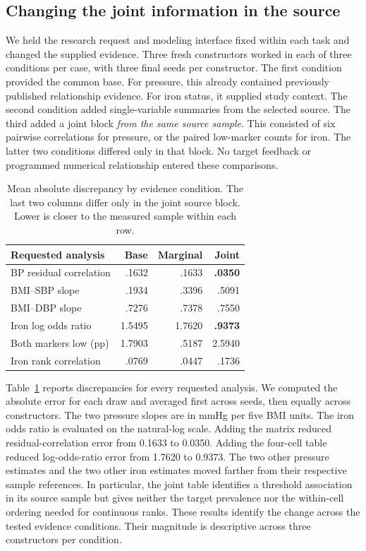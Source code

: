 \documentclass[sigconf,anonymous,review]{acmart}
\begin{document}
\subsection{Changing the joint information in the source}
\label{sec:controlled}
We held the research request and modeling interface fixed within each task and changed the supplied evidence. Three fresh constructors worked in each of three conditions per case, with three final seeds per constructor. The first condition provided the common base. For pressure, this already contained previously published relationship evidence. For iron status, it supplied study context. The second condition added single-variable summaries from the selected source. The third added a joint block \emph{from the same source sample}. This consisted of six pairwise correlations for pressure, or the paired low-marker counts for iron. The latter two conditions differed only in that block. No target feedback or programmed numerical relationship entered these comparisons.

\begin{table}[t]
\caption{Mean absolute discrepancy by evidence condition. The last two columns differ only in the joint source block. Lower is closer to the measured sample within each row.}
\label{tab:evidence}
\centering
\begin{tabular}{@{}lrrr@{}}
\toprule
Requested analysis & Base & Marginal & Joint\\
\midrule
BP residual correlation & .1632 & .1633 & \textbf{.0350}\\
BMI--SBP slope & .1934 & .3396 & .5091\\
BMI--DBP slope & .7276 & .7378 & .7550\\
Iron log odds ratio & 1.5495 & 1.7620 & \textbf{.9373}\\
Both markers low (pp) & 1.7903 & .5187 & 2.5940\\
Iron rank correlation & .0769 & .0447 & .1736\\
\bottomrule
\end{tabular}
\end{table}

Table~\ref{tab:evidence} reports discrepancies for every requested analysis. We computed the absolute error for each draw and averaged first across seeds, then equally across constructors. The two pressure slopes are in mmHg per five BMI units. The iron odds ratio is evaluated on the natural-log scale. Adding the matrix reduced residual-correlation error from 0.1633 to 0.0350. Adding the four-cell table reduced log-odds-ratio error from 1.7620 to 0.9373. The two other pressure estimates and the two other iron estimates moved farther from their respective sample references. In particular, the joint table identifies a threshold association in its source sample but gives neither the target prevalence nor the within-cell ordering needed for continuous ranks. These results identify the change across the tested evidence conditions. Their magnitude is descriptive across three constructors per condition.
\end{document}
